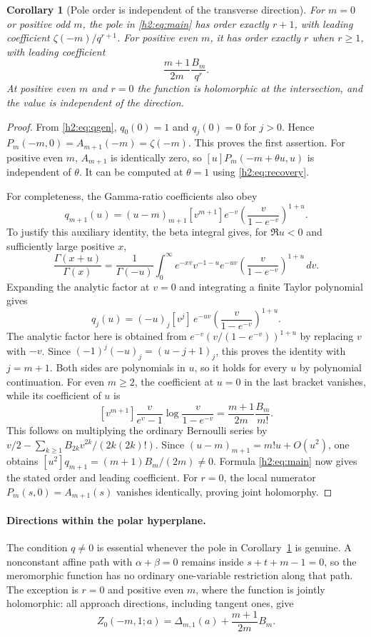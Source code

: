 \documentclass[11pt,a4paper]{article}
\newtheorem{corollary}[theorem]{Corollary}
\theoremstyle{definition}
\theoremstyle{remark}
\numberwithin{equation}{section}
\begin{document}
\begin{corollary}[Pole order is independent of the transverse direction]
\label{h2:cor:poles}
For $m=0$ or positive odd $m$, the pole in \eqref{h2:eq:main} has order
exactly $r+1$, with leading coefficient
$\zeta(-m)/q^{r+1}$. For positive even $m$, it has order exactly $r$
when $r\ge1$, with leading coefficient
\[
 \frac{m+1}{2m}\frac{B_m}{q^r}.
\]
At positive even $m$ and $r=0$ the function is holomorphic at the
intersection, and the value is independent of the direction.
\end{corollary}
\begin{proof}
From \eqref{h2:eq:qgen}, $q_0(0)=1$ and $q_j(0)=0$ for $j>0$.
Hence $P_m(-m,0)=A_{m+1}(-m)=\zeta(-m)$. This proves the first
assertion. For positive even $m$, $A_{m+1}$ is identically zero, so
$[u]P_m(-m+\theta u,u)$ is independent of $\theta$. It can be
computed at $\theta=1$ using \eqref{h2:eq:recovery}.

For completeness, the Gamma-ratio coefficients also obey
\[
 q_{m+1}(u)=(u-m)_{m+1}[v^{m+1}]
                e^{-v}\left(\frac{v}{1-e^{-v}}\right)^{1+u}.
\]
To justify this auxiliary identity, the beta integral gives, for
$\Re u<0$ and sufficiently large positive $x$,
\[
 \frac{\Gamma(x+u)}{\Gamma(x)}
 =\frac1{\Gamma(-u)}\int_0^\infty e^{-xv}v^{-1-u}
       e^{-uv}\left(\frac{v}{1-e^{-v}}\right)^{1+u}\,dv.
\]
Expanding the analytic factor at $v=0$ and integrating a finite Taylor
polynomial gives
\[
 q_j(u)=(-u)_j[v^j]\,
          e^{-uv}\left(\frac{v}{1-e^{-v}}\right)^{1+u}.
\]
The analytic factor here is obtained from
$e^{-v}(v/(1-e^{-v}))^{1+u}$ by replacing $v$ with $-v$.
Since $(-1)^j(-u)_j=(u-j+1)_j$, this proves the identity with
$j=m+1$. Both sides are polynomials in $u$, so it holds for every $u$
by polynomial continuation.
For even $m\ge2$, the coefficient at $u=0$ in the last bracket
vanishes, while its coefficient of $u$ is
\[
 [v^{m+1}]\frac{v}{e^v-1}
                   \log\frac{v}{1-e^{-v}}
       =\frac{m+1}{2m}\frac{B_m}{m!}.
\]
This follows on multiplying the ordinary Bernoulli series by
$v/2-\sum_{k\ge1}B_{2k}v^{2k}/(2k(2k)!)$.
Since $(u-m)_{m+1}=m!u+O(u^2)$, one obtains
$[u^2]q_{m+1}=(m+1)B_m/(2m)\ne0$. Formula
\eqref{h2:eq:main} now gives the stated order and leading coefficient.
For $r=0$, the local numerator $P_m(s,0)=A_{m+1}(s)$ vanishes
identically, proving joint holomorphy.
\end{proof}

\paragraph{Directions within the polar hyperplane.}
The condition $q\ne0$ is essential whenever the pole in
Corollary~\ref{h2:cor:poles} is genuine. A nonconstant affine path with
$\alpha+\beta=0$ remains inside $s+t+m-1=0$, so the meromorphic function
has no ordinary one-variable restriction along that path. The exception
is $r=0$ and positive even $m$, where the function is jointly holomorphic:
all approach directions, including tangent ones, give
\[
 Z_0(-m,1;a)=\Delta_{m,1}(a)+\frac{m+1}{2m}B_m.
\]
\end{document}
